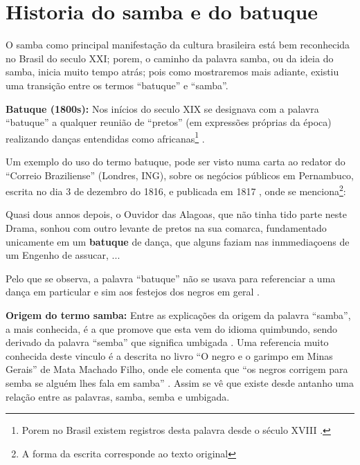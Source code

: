 
\chapter{Historia do samba e do batuque}
O samba como principal manifestação da cultura brasileira está bem reconhecida no Brasil do seculo XXI;
porem, o caminho da palavra samba, ou da ideia do samba, inicia muito tempo atrás;
pois como mostraremos mais adiante, existiu uma transição entre os termos ``batuque'' e ``samba''.
\begin{remarcar}
\textbf{Batuque (1800s):}
\label{ref:batuquedanca1800}
Nos inícios do seculo XIX
se designava com a palavra ``batuque''  a qualquer reunião de ``pretos'' (em expressões próprias da época) realizando danças entendidas como africanas\footnote{
Porem no Brasil existem registros desta palavra desde o século XVIII \cite[pp. 85]{sandroni2001feitico}. }
\cite[pp. 54]{de4danccas} \cite[pp. 73]{lara2007memoria}.
\end{remarcar}
Um exemplo do uso do termo batuque, pode ser visto numa carta ao redator do ``Correio Braziliense''  (Londres, ING),
sobre os negócios públicos em Pernambuco,
escrita no dia 3 de dezembro do 1816, e publicada em 1817 \cite[pp. 468]{batuqueBraziliense},
onde se menciona\footnote{\label{footort}A forma da escrita corresponde ao texto original}:
\begin{citando}%
Quasi dous annos depois, o Ouvidor das Alagoas, que não tinha tido parte neste Drama,
sonhou com outro levante de pretos na sua comarca, 
fundamentado unicamente em um \textbf{batuque} de dança, 
que alguns faziam nas inmmediaçoens de um Engenho de assucar, ...
\end{citando} 
Pelo que se observa, 
a palavra ``batuque'' não se usava para referenciar a uma dança em particular e sim aos festejos dos negros em geral \cite[pp. 85]{sandroni2001feitico}.


\begin{remarcar}
\textbf{Origem do termo samba:}
Entre as explicações da origem da palavra ``samba'', 
a mais conhecida, é a que promove que esta vem do idioma quimbundo, 
sendo derivado da palavra ``semba''  que significa umbigada \cite[pp. 32]{jornalsambaderoda2} \cite[pp. 47]{diniz2008almanaque} \cite[pp. 50]{da2015historia}.
Uma referencia muito conhecida deste vinculo é a descrita no livro ``O negro e o garimpo em Minas Gerais''
de Mata Machado Filho, onde ele comenta que ``os negros corrigem para semba se 
alguém lhes fala em samba'' \cite[pp. 85]{sandroni2001feitico}. Assim se vê que existe
desde antanho uma relação entre as palavras, 
samba, semba e umbigada.
\end{remarcar}

